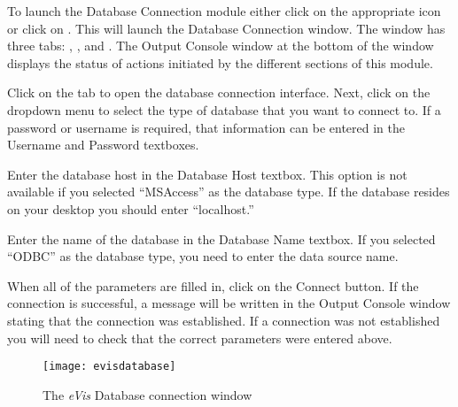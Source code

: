 \label{evis_launch_database}

To launch the Database Connection module either click on the appropriate icon
 or click on  \arrow {} \arrow
{}. This will launch the Database Connection window. The window has
three tabs: , , and . The Output
Console window at the bottom of the window displays the status of actions initiated by the different
sections of this module.

\label{evis_connect_database}

Click on the  tab to open the database connection interface. Next, click on
the  dropdown menu to select the type of database that you want to
connect to. If a password or username is required, that information can be entered in the Username
and Password textboxes.

Enter the database host in the Database Host textbox. This option is not available if you selected
``MSAccess'' as the database type. If the database resides on your desktop you should enter
``localhost.''

Enter the name of the database in the Database Name textbox. If you selected ``ODBC'' as the
database type, you need to enter the data source name.

When all of the parameters are filled in, click on the Connect button. If the connection is
successful, a message will be written in the Output Console window stating that the connection was
established. If a connection was not established you will need to check that the correct parameters
were entered above.

\begin{figure}[ht]
   \centering
   \texttt{[image: evisdatabase]}
   \caption{The \emph{eVis} Database connection window \wincaption}\label{evisdatabase}
\end{figure}

